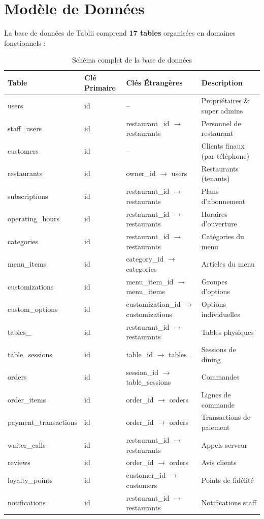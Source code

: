 \documentclass[12pt,a4paper]{report}
\begin{document}
\section{Modèle de Données}

La base de données de Tablii comprend \textbf{17 tables} organisées en domaines fonctionnels :

\begin{table}[H]
    \centering
    \begin{tabularx}{\textwidth}{l l l l}
        \toprule
        \rowcolor{primary!10}
        \textbf{Table} & \textbf{Clé Primaire} & \textbf{Clés Étrangères} & \textbf{Description} \\
        \midrule
        users & id & -- & Propriétaires \& super admins \\
        staff\_users & id & restaurant\_id $\to$ restaurants & Personnel de restaurant \\
        customers & id & -- & Clients finaux (par téléphone) \\
        restaurants & id & owner\_id $\to$ users & Restaurants (tenants) \\
        subscriptions & id & restaurant\_id $\to$ restaurants & Plans d'abonnement \\
        operating\_hours & id & restaurant\_id $\to$ restaurants & Horaires d'ouverture \\
        categories & id & restaurant\_id $\to$ restaurants & Catégories du menu \\
        menu\_items & id & category\_id $\to$ categories & Articles du menu \\
        customizations & id & menu\_item\_id $\to$ menu\_items & Groupes d'options \\
        custom\_options & id & customization\_id $\to$ customizations & Options individuelles \\
        tables\_ & id & restaurant\_id $\to$ restaurants & Tables physiques \\
        table\_sessions & id & table\_id $\to$ tables\_ & Sessions de dining \\
        orders & id & session\_id $\to$ table\_sessions & Commandes \\
        order\_items & id & order\_id $\to$ orders & Lignes de commande \\
        payment\_transactions & id & order\_id $\to$ orders & Transactions de paiement \\
        waiter\_calls & id & restaurant\_id $\to$ restaurants & Appels serveur \\
        reviews & id & order\_id $\to$ orders & Avis clients \\
        loyalty\_points & id & customer\_id $\to$ customers & Points de fidélité \\
        notifications & id & restaurant\_id $\to$ restaurants & Notifications staff \\
        \bottomrule
    \end{tabularx}
    \caption{Schéma complet de la base de données}
    \label{tab:schema}
\end{table}
\end{document}
